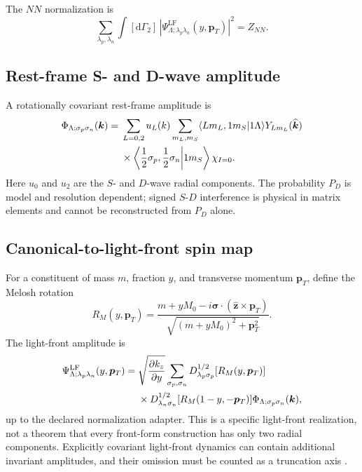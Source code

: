 \documentclass[11pt]{article}
\newcommand{\pT}{\bm{p}_{T}}
\newcommand{\dd}{\mathrm{d}}
\newcommand{\LF}{\mathrm{LF}}
\newcommand{\abs}[1]{\left|#1\right|}
\newcommand{\NN}{NN}
\begin{document}
The \(NN\) normalization is
\begin{equation}
 \sum_{\lambda_p,\lambda_n}
 \int[\dd\Gamma_2]\,
 \abs{\Psi_{\Lambda;\lambda_p\lambda_n}^{\LF}(y,\pT)}^2
 =Z_{\NN}.
\label{eq:nn-normalization}
\end{equation}

\subsection{Rest-frame S- and D-wave amplitude}

A rotationally covariant rest-frame amplitude is
\begin{align}
 \Phi_{\Lambda;\sigma_p\sigma_n}(\bm k)
 ={}&\sum_{L=0,2}u_L(k)
 \sum_{m_L,m_S}
 \langle Lm_L,1m_S|1\Lambda\rangle
 Y_{Lm_L}(\widehat{\bm k})
 \notag\\
 &\times
 \left\langle\frac12\sigma_p,\frac12\sigma_n\middle|1m_S\right\rangle
 \chi_{I=0}.
\label{eq:instant-sd-wave}
\end{align}
Here \(u_0\) and \(u_2\) are the \(S\)- and \(D\)-wave radial components.
The probability \(P_D\) is model and resolution dependent; signed
\(S\)-\(D\) interference is physical in matrix elements and cannot be
reconstructed from \(P_D\) alone.

\subsection{Canonical-to-light-front spin map}

For a constituent of mass \(m\), fraction \(y\), and transverse momentum
\(\pT\), define the Melosh rotation
\begin{equation}
 R_M(y,\pT)
 =\frac{m+yM_0
 -i\bm\sigma\cdot(\widehat{\bm z}\times\pT)}
 {\sqrt{(m+yM_0)^2+\pT^2}}.
\label{eq:melosh-rotation}
\end{equation}
The light-front amplitude is
\begin{align}
 \Psi_{\Lambda;\lambda_p\lambda_n}^{\LF}(y,\pT)
 ={}&
 \sqrt{\frac{\partial k_z}{\partial y}}
 \sum_{\sigma_p,\sigma_n}
 D^{1/2}_{\lambda_p\sigma_p}[R_M(y,\pT)]
 \notag\\
 &\times
 D^{1/2}_{\lambda_n\sigma_n}[R_M(1-y,-\pT)]
 \Phi_{\Lambda;\sigma_p\sigma_n}(\bm k),
\label{eq:lf-wavefunction-map}
\end{align}
up to the declared normalization adapter.  This is a specific light-front
realization, not a theorem that every front-form construction has only two
radial components.  Explicitly covariant light-front dynamics can contain
additional invariant amplitudes, and their omission must be counted as a
truncation axis \cite{Carbonell1998}.
\end{document}
